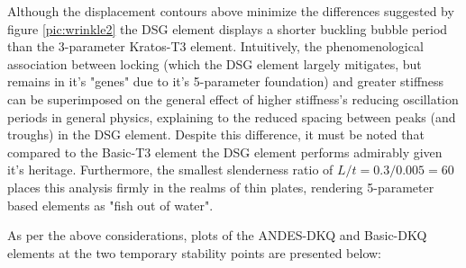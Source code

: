 Although the displacement contours above minimize the differences suggested by figure \ref{pic:wrinkle2} the DSG element displays a shorter buckling bubble period than the 3-parameter Kratos-T3 element. Intuitively, the phenomenological association between locking (which the DSG element largely mitigates, but remains in it's "genes" due to it's 5-parameter foundation) and greater stiffness can be superimposed on the general effect of higher stiffness's reducing oscillation periods in general physics, explaining to the reduced spacing between peaks (and troughs) in the DSG element. Despite this difference, it must be noted that compared to the Basic-T3 element the DSG element performs admirably given it's heritage. Furthermore, the smallest slenderness ratio of $L/t = 0.3/0.005 = 60$ places this analysis firmly in the realms of thin plates, rendering 5-parameter based elements as "fish out of water".

As per the above considerations, plots of the ANDES-DKQ and Basic-DKQ elements at the two temporary stability points are presented below:

